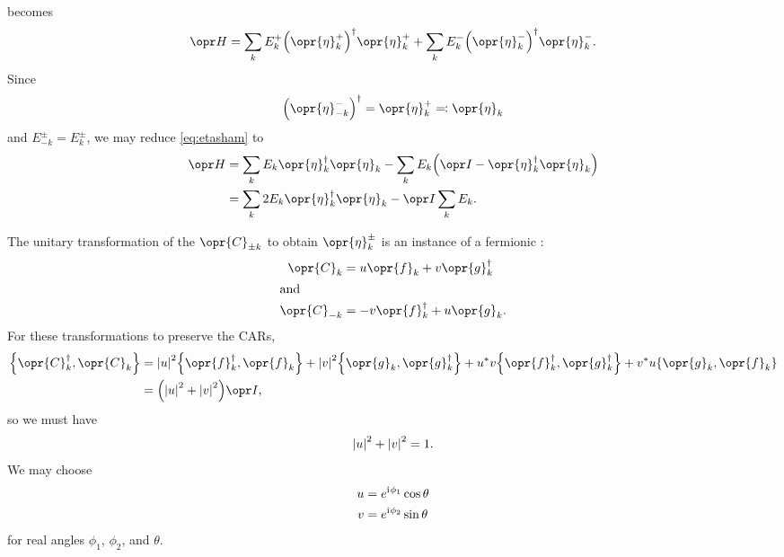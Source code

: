 \documentclass[../thesis.tex]{subfiles}
\begin{document}
 becomes
\begin{equation}
  \ham
  = \sum_k E_k^+{\qty(\opr{\eta}_k^+)}^\dag\opr{\eta}_k^+
  + \sum_k E_k^-{\qty(\opr{\eta}_k^-)}^\dag\opr{\eta}_k^-.
  \label{eq:etasham}
\end{equation}
Since
\begin{equation}
  {\qty(\opr{\eta}_{-k}^-)}^\dag
  = \opr{\eta}_k^+
  \eqqcolon \opr{\eta}_k
\end{equation}
and $E_{-k}^\pm = E_k^\pm$, we may reduce \cref{eq:etasham} to
\begin{align}
  \ham
  &= \sum_k E_k\opr{\eta}_k^\dag \opr{\eta}_k
  - \sum_k E_k\qty(\idopr - \opr{\eta}_k^\dag \opr{\eta}_k)
  \\
  &= \sum_k 2E_k\opr{\eta}_k^\dag\opr{\eta}_k
  - \idopr\sum_k E_k.
  \label{eq:etaham}
\end{align}

The unitary transformation of the $\opr{C}_{\pm k}$ to obtain $\opr{\eta}_k^\pm$
is an instance of a fermionic :
\begin{subequations}
  \begin{align}
    \opr{C}_k
  &= u\opr{f}_k + v\opr{g}_k^\dag \\
  \shortintertext{and}
  \opr{C}_{-k}
  &= -v\opr{f}_k^\dag + u\opr{g}_k.
  \end{align}\label{eq:bogoliubov}
\end{subequations}
For these transformations to preserve the CARs,
\begin{align}
  \acomm{\opr{C}_k^\dag}{\opr{C}_k}
  &= \abs{u}^2 \acomm{\opr{f}_k^\dag}{\opr{f}_k}
  + \abs{v}^2 \acomm{\opr{g}_k}{\opr{g}_k^\dag}
  + u^* v \acomm{\opr{f}_k^\dag}{\opr{g}_k^\dag}
  + v^* u \acomm{\opr{g}_k}{\opr{f}_k} \\
  &= \qty(\abs{u}^2 + \abs{v}^2) \idopr,
\end{align}
so we must have
\begin{equation}
  \abs{u}^2 + \abs{v}^2 = 1.
\end{equation}
We may choose
  \begin{align}
    u &= e^{\mathrm{i}\mkern1mu\phi_1}\cos\theta \\
    v &= e^{\mathrm{i}\mkern1mu\phi_2}\sin\theta
  \end{align}\label{eq:uv-param}
for real angles $\phi_1$, $\phi_2$, and $\theta$.
\end{document}
